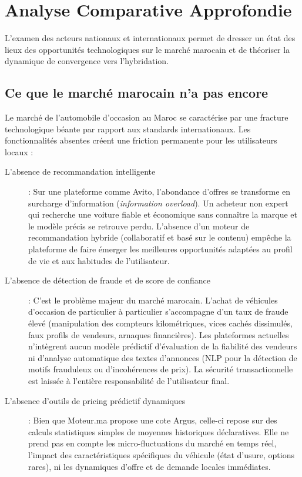 \documentclass[11pt,a4paper]{article}
\begin{document}
\newpage

\section{Analyse Comparative Approfondie}

L'examen des acteurs nationaux et internationaux permet de dresser un état des lieux des opportunités technologiques sur le marché marocain et de théoriser la dynamique de convergence vers l'hybridation.

\subsection{Ce que le marché marocain n'a pas encore}
Le marché de l'automobile d'occasion au Maroc se caractérise par une fracture technologique béante par rapport aux standards internationaux. Les fonctionnalités absentes créent une friction permanente pour les utilisateurs locaux :

\begin{description}
    \item[L'absence de recommandation intelligente] : Sur une plateforme comme Avito, l'abondance d'offres se transforme en surcharge d'information (\textit{information overload}). Un acheteur non expert qui recherche une voiture fiable et économique sans connaître la marque et le modèle précis se retrouve perdu. L'absence d'un moteur de recommandation hybride (collaboratif et basé sur le contenu) empêche la plateforme de faire émerger les meilleures opportunités adaptées au profil de vie et aux habitudes de l'utilisateur.
    \item[L'absence de détection de fraude et de score de confiance] : C'est le problème majeur du marché marocain. L'achat de véhicules d'occasion de particulier à particulier s'accompagne d'un taux de fraude élevé (manipulation des compteurs kilométriques, vices cachés dissimulés, faux profils de vendeurs, arnaques financières). Les plateformes actuelles n'intègrent aucun modèle prédictif d'évaluation de la fiabilité des vendeurs ni d'analyse automatique des textes d'annonces (NLP pour la détection de motifs frauduleux ou d'incohérences de prix). La sécurité transactionnelle est laissée à l'entière responsabilité de l'utilisateur final.
    \item[L'absence d'outils de pricing prédictif dynamiques] : Bien que Moteur.ma propose une cote Argus, celle-ci repose sur des calculs statistiques simples de moyennes historiques déclaratives. Elle ne prend pas en compte les micro-fluctuations du marché en temps réel, l'impact des caractéristiques spécifiques du véhicule (état d'usure, options rares), ni les dynamiques d'offre et de demande locales immédiates.
\end{description}
\end{document}
